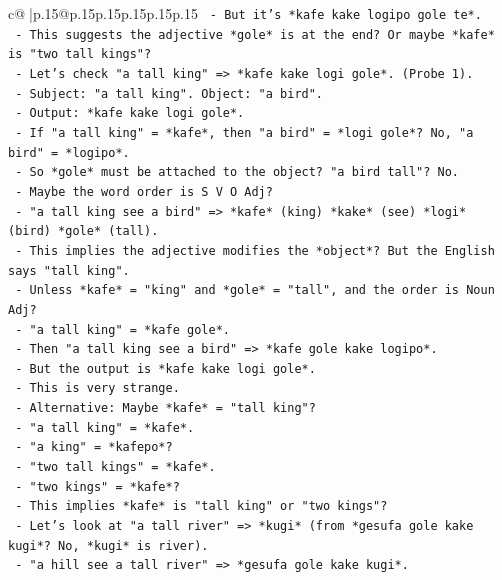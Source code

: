 \documentclass{article}
\begin{document}
{\begin{supertabular}{c@{$\;$}|p{.15\linewidth}@{}p{.15\linewidth}p{.15\linewidth}p{.15\linewidth}p{.15\linewidth}p{.15\linewidth}}
{{{\texttt{          {-} But it's *kafe kake logipo gole te*.} \\
\texttt{          {-} This suggests the adjective *gole* is at the end? Or maybe *kafe* is "two tall kings"?} \\
\texttt{          {-} Let's check "a tall king" => *kafe kake logi gole*. (Probe 1).} \\
\texttt{          {-} Subject: "a tall king". Object: "a bird".} \\
\texttt{          {-} Output: *kafe kake logi gole*.} \\
\texttt{          {-} If "a tall king" = *kafe*, then "a bird" = *logi gole*? No, "a bird" = *logipo*.} \\
\texttt{          {-} So *gole* must be attached to the object? "a bird tall"? No.} \\
\texttt{          {-} Maybe the word order is S V O Adj?} \\
\texttt{          {-} "a tall king see a bird" => *kafe* (king) *kake* (see) *logi* (bird) *gole* (tall).} \\
\texttt{          {-} This implies the adjective modifies the *object*? But the English says "tall king".} \\
\texttt{          {-} Unless *kafe* = "king" and *gole* = "tall", and the order is Noun Adj?} \\
\texttt{          {-} "a tall king" = *kafe gole*.} \\
\texttt{          {-} Then "a tall king see a bird" => *kafe gole kake logipo*.} \\
\texttt{          {-} But the output is *kafe kake logi gole*.} \\
\texttt{          {-} This is very strange.} \\
\texttt{          {-} Alternative: Maybe *kafe* = "tall king"?} \\
\texttt{          {-} "a tall king" = *kafe*.} \\
\texttt{          {-} "a king" = *kafepo*?} \\
\texttt{          {-} "two tall kings" = *kafe*.} \\
\texttt{          {-} "two kings" = *kafe*?} \\
\texttt{          {-} This implies *kafe* is "tall king" or "two kings"?} \\
\texttt{          {-} Let's look at "a tall river" => *kugi* (from *gesufa gole kake kugi*? No, *kugi* is river).} \\
\texttt{          {-} "a hill see a tall river" => *gesufa gole kake kugi*.} \\
}}}
\end{supertabular}}
\end{document}
